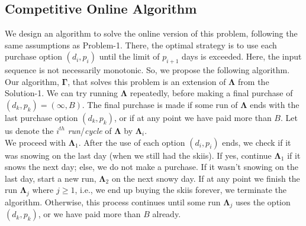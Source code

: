 \documentclass[11pt]{article}
\begin{document}
\subsection*{Competitive Online Algorithm}
We design an algorithm to solve the online version of this problem, following the same assumptions as Problem-1. There, the optimal
strategy is to use each purchase option $(d_{i}, p_{i})$ until the limit of $p_{i+1}$ days is exceeded. Here, the input sequence is not
necessarily monotonic. So, we propose the following algorithm. \\
Our algorithm, $\mathbf{\Gamma}$, that solves this problem is an extension of $\mathbf{\Lambda}$ from the Solution-1. We can
try running $\mathbf{\Lambda}$ repeatedly, before making a final purchase of $(d_{k}, p_{k}) = (\infty, B)$. The final purchase is
made if some run of $\mathbf{\Lambda}$ ends with the last purchase option $(d_{k}, p_{k})$, or if at any point we have paid more than $B$.
Let us denote the $i^{th}$ \textit{run}/\textit{cycle} of $\mathbf{\Lambda}$ by $\mathbf{\Lambda}_{i}$. \\
We proceed with $\mathbf{\Lambda}_{1}$. After the use of each option $(d_{i}, p_{i})$ ends, we check if it was snowing on the last day
(when we still had the skiis). If yes, continue $\mathbf{\Lambda}_{1}$ if it snows the next day; else, we do not make a purchase. If
it wasn't snowing on the last day, start a new run, $\mathbf{\Lambda}_{2}$ on the next snowy day. If at any point we finish the run $\mathbf{\Lambda}_{j}$
where $j \geq 1$, i.e., we end up buying the skiis forever, we terminate the algorithm. Otherwise, this process continues until some run
$\mathbf{\Lambda}_{j}$ uses the option $(d_{k}, p_{k})$, or we have paid more than $B$ already.
\end{document}
